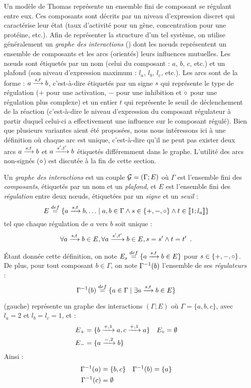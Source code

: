 Un modèle de Thomas représente un ensemble fini de composant se régulant entre eux.
Ces composants sont décrits par un niveau d'expression discret qui
caractérise leur état (taux d'activité pour un gène, concentration pour une protéine, etc.).
Afin de représenter la structure d'un tel système,
on utilise généralement un \emph{graphe des interactions} ()
dont les nœuds représentent un ensemble de composants
et les arcs (orientés) leurs influences mutuelles.
Les nœuds sont étiquetés par un nom (celui du composant : $a$, $b$, $c$, etc.)
et un plafond (son niveau d'expression maximum : $l_a$, $l_b$, $l_c$, etc.).
Les arcs sont de la forme : $a \xrightarrow{s, t} b$,
c'est-à-dire étiquetés par un signe $s$ qui représente le type de régulation
($+$ pour une activation, $-$ pour une inhibition
et $\circ$ pour une régulation plus complexe)
et un entier $t$ qui représente le seuil de déclenchement de la réaction
(c'est-à-dire le niveau d'expression du composant régulateur à partir duquel celui-ci
a effectivement une influence sur le composant régulé).
Bien que plusieurs variantes aient été proposées,
nous nous intéressons ici à une définition où
chaque arc est unique, c'est-à-dire qu'il ne peut pas exister deux arcs
$a \xrightarrow{s, t} b$ et $a \xrightarrow{s', t'} b$ étiquetés différemment dans le graphe.
L'utilité des arcs non-signés ($\circ$) est discutée à la fin de cette section.

\begin{definition}
  Un \emph{graphe des interactions} est un couple $\mathcal{G} = (\Gamma; E)$ où
  $\Gamma$ est l'ensemble fini des \emph{composants},
  étiquetés par un nom et un \emph{plafond},
  et $E$ est l'ensemble fini des \emph{régulation} entre deux nœuds,
  étiquetées par un \emph{signe} et un \emph{seuil} :
    \[E \stackrel{def}= \{ a \xrightarrow{s, t} b, \ldots \mid
      a, b \in \Gamma \wedge s \in \{ +, -, \circ \} \wedge t \in \mathopen{\llbracket}1\mathclose{};l_a\mathclose{\rrbracket}\}\]
  tel que chaque régulation de $a$ vers $b$ soit unique :
    \[\forall a \xrightarrow{s, t} b \in E,
      \forall a \xrightarrow{s', t'} b \in E, s = s' \wedge t = t' \enspace.\]
\end{definition}
%
Étant donnée cette définition, on note
$E_s \stackrel{def}= \{ a \xrightarrow{s, t} b \in E \}$ pour $s \in \{ +, -, \circ \}$.
De plus, pour tout composant $b \in \Gamma$, on note $\Gamma^{-1}(b)$ l'ensemble de ses
\emph{régulateurs} :
    \[\Gamma^{-1}(b) \stackrel{def}= \{ a \in \Gamma \mid \exists a \xrightarrow{s, t} b \in E \}\]

\begin{example}
  (gauche) représente un graphe des interactions $(\Gamma; E)$ où
  $\Gamma = \{a, b, c\}$, avec $l_a = 2$ et $l_b = l_c = 1$, et :
  \begin{align*}
    E_+ &= \{b \xrightarrow{+, 1} a, c \xrightarrow{+, 1} a\} &
    E_\circ &= \emptyset \\
    E_- &= \{a \xrightarrow{-, 2} b\}
  \end{align*}
  Ainsi :
  \begin{align*}
    \Gamma^{-1}(a) &= \{ b, c \} &
    \Gamma^{-1}(b) &= \{ a \} \\
    \Gamma^{-1}(c) &= \emptyset
  \end{align*}
\end{example}

